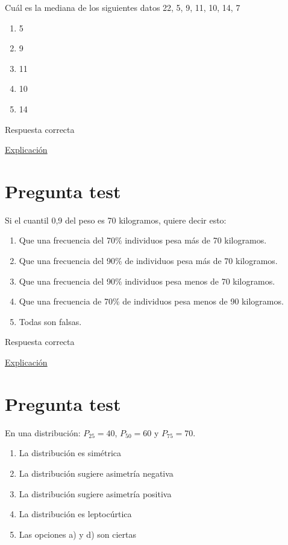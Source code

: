 \documentclass[
]{book}
\providecommand{\tightlist}{%
  \setlength{\itemsep}{0pt}\setlength{\parskip}{0pt}}
\begin{document}
Cuál es la mediana de los siguientes datos 22, 5, 9, 11, 10, 14, 7

\begin{enumerate}
\def\labelenumi{\alph{enumi})}
\tightlist
\item
  5
\item
  9
\item
  11
\item
  10
\item
  14
\end{enumerate}

Respuesta correcta

\href{https://1fjmanzano.github.io/bioestadistica/medidas-de-posicio\%CC\%81n-dispersio\%CC\%81n-y-forma.html\#medidas-de-posicio\%CC\%81n-centrales}{Explicación}

\hypertarget{pregunta-test-87}{%
\section{Pregunta test}\label{pregunta-test-87}}

Si el cuantil 0,9 del peso es 70 kilogramos, quiere decir esto:

\begin{enumerate}
\def\labelenumi{\alph{enumi})}
\tightlist
\item
  Que una frecuencia del 70\% individuos pesa más de 70 kilogramos.
\item
  Que una frecuencia del 90\% de individuos pesa más de 70 kilogramos.
\item
  Que una frecuencia del 90\% individuos pesa menos de 70 kilogramos.
\item
  Que una frecuencia de 70\% de individuos pesa menos de 90 kilogramos.
\item
  Todas son falsas.
\end{enumerate}

Respuesta correcta

\href{https://1fjmanzano.github.io/bioestadistica/medidas-de-posicio\%CC\%81n-dispersio\%CC\%81n-y-forma.html\#medidas-de-posicio\%CC\%81n-centrales}{Explicación}

\hypertarget{pregunta-test-88}{%
\section{Pregunta test}\label{pregunta-test-88}}

En una distribución: \(P_{25} = 40\), \(P_{50} =60\) y \(P_{75} =70\).

\begin{enumerate}
\def\labelenumi{\alph{enumi})}
\tightlist
\item
  La distribución es simétrica
\item
  La distribución sugiere asimetría negativa
\item
  La distribución sugiere asimetría positiva
\item
  La distribución es leptocúrtica
\item
  Las opciones a) y d) son ciertas
\end{enumerate}
\end{document}
